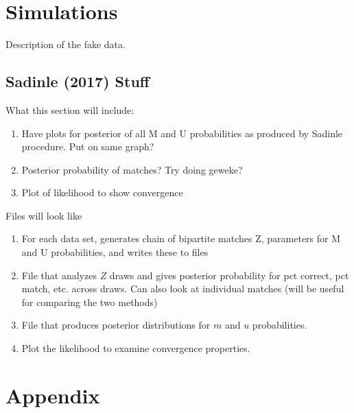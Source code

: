 \documentclass[11pt,reqno]{amsart}
\begin{document}
\section{Simulations}
Description of the fake data.  
\subsection{Sadinle (2017) Stuff}
What this section will include:
\begin{enumerate}
\item Have plots for posterior of all M and U probabilities as produced by Sadinle procedure.  Put on same graph? 
\item Posterior probability of matches? Try doing geweke? 
\item Plot of likelihood to show convergence
\end{enumerate}

Files will look like 
\begin{enumerate}
\item For each data set, generates chain of bipartite matches Z, parameters for M and U probabilities, and writes these to files
\item File that analyzes $Z$ draws and gives posterior probability for pct correct, pct match, etc. across draws.  Can also look at individual matches (will be useful for comparing the two methods)
\item File that produces posterior distributions for $m$ and $u$ probabilities. 
\item Plot the likelihood to examine convergence properties.  
\end{enumerate}

\newpage




\newpage
\appendix
\section{Appendix}
\end{document}
